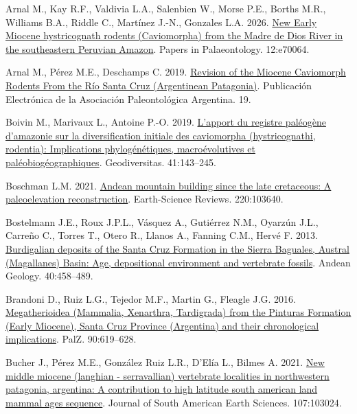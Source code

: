 \documentclass[
  9pt,
  letterpaper,
]{article}
\newlength{\cslhangindent}
\newenvironment{CSLReferences}[2] %
 {\begin{list}{}{%
  \setlength{\itemindent}{0pt}
  \setlength{\leftmargin}{0pt}
  \setlength{\parsep}{0pt}
  \ifodd #1
   \setlength{\leftmargin}{\cslhangindent}
   \setlength{\itemindent}{-1\cslhangindent}
  \fi
  \setlength{\itemsep}{#2\baselineskip}}}
 {\end{list}}
\begin{document}
\label{refs}
\begin{CSLReferences}{1}{1}
Arnal M., Kay R.F., Valdivia L.A., Salenbien W., Morse P.E., Borths
M.R., Williams B.A., Riddle C., Martínez J.-N., Gonzales L.A. 2026.
\href{https://doi.org/10.1002/spp2.70064}{New Early Miocene
hystricognath rodents (Caviomorpha) from the Madre de Dios River in the
southeastern Peruvian Amazon}. Papers in Palaeontology. 12:e70064.

Arnal M., Pérez M.E., Deschamps C. 2019.
\href{https://doi.org/10.5710/PEAPA.25.09.2019.299}{Revision of the
Miocene Caviomorph Rodents From the Río Santa Cruz (Argentinean
Patagonia)}. Publicación Electrónica de la Asociación Paleontológica
Argentina. 19.

Boivin M., Marivaux L., Antoine P.-O. 2019.
\href{https://doi.org/10.5252/geodiversitas2019v41a4}{L'apport du
registre paléogène d'amazonie sur la diversification initiale des
caviomorpha (hystricognathi, rodentia): Implications phylogénétiques,
macroévolutives et paléobiogéographiques}. Geodiversitas. 41:143--245.

Boschman L.M. 2021.
\href{https://doi.org/10.1016/j.earscirev.2021.103640}{Andean mountain
building since the late cretaceous: A paleoelevation reconstruction}.
Earth-Science Reviews. 220:103640.

Bostelmann J.E., Roux J.P.L., Vásquez A., Gutiérrez N.M., Oyarzún J.L.,
Carreño C., Torres T., Otero R., Llanos A., Fanning C.M., Hervé F. 2013.
\href{https://doi.org/10.5027/andgeoV40n3-a04}{Burdigalian deposits of
the Santa Cruz Formation in the Sierra Baguales, Austral (Magallanes)
Basin: Age, depositional environment and vertebrate fossils}. Andean
Geology. 40:458--489.

Brandoni D., Ruiz L.G., Tejedor M.F., Martin G., Fleagle J.G. 2016.
\href{https://doi.org/10.1007/s12542-016-0306-8}{Megatherioidea
(Mammalia, Xenarthra, Tardigrada) from the Pinturas Formation (Early
Miocene), Santa Cruz Province (Argentina) and their chronological
implications}. PalZ. 90:619--628.

Bucher J., Pérez M.E., González Ruiz L.R., D'Elía L., Bilmes A. 2021.
\href{https://doi.org/10.1016/j.jsames.2020.103024}{New middle miocene
(langhian - serravallian) vertebrate localities in northwestern
patagonia, argentina: A contribution to high latitude south american
land mammal ages sequence}. Journal of South American Earth Sciences.
107:103024.


\end{CSLReferences}
\end{document}
